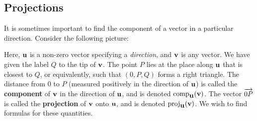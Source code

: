 \subsection{Projections}\label{ssec:projections}

It is sometimes important to find the component of a vector in a
particular direction. Consider the following picture:
\begin{center}
\end{center}
Here, $\mbox{\bf u}$ is a non-zero vector specifying a {\em direction},
and $\mbox{\bf v}$ is any vector. We have given the label $Q$ to the tip
of $\mbox{\bf v}$. The point $P$ lies at the place along $\mbox{\bf u}$ that
is closest to $Q$, or equivalently, such that $(0,P,Q)$ forms a right
triangle. The distance from $0$ to $P$ (measured positively in the
direction of $\mbox{\bf u}$) is called the \textbf{component}%
 of $\mbox{\bf v}$ in
the direction of $\mbox{\bf u}$, and is denoted
$\mbox{\rm comp}_{\mbox{\bf u}}(\mbox{\bf v})$. The vector $\overrightarrow{0P}$ is
called the \textbf{projection} of $\mbox{\bf v}$ onto $\mbox{\bf u}$,
and is denoted $\mbox{\rm proj}_{\mbox{\bf u}}(\mbox{\bf v})$. We wish to find
formulas for these quantities.

